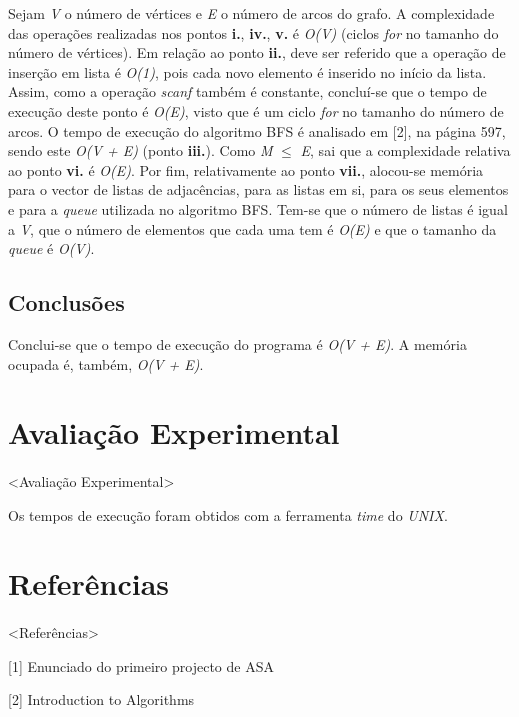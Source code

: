\documentclass[12pt, a4paper, margin=3cm]{article}
\begin{document}
Sejam \textit{V} o número de vértices e \textit{E} o número de arcos do grafo.
A complexidade das operações realizadas nos pontos \textbf{i.}, \textbf{iv.},
\textbf{v.} é \textit{O(V)} (ciclos \textit{for} no tamanho do número de vértices).
Em relação ao ponto \textbf{ii.}, deve ser referido que a operação de inserção
em lista é \textit{O(1)}, pois cada novo elemento é inserido no início da lista.
Assim, como a operação \textit{scanf} também é constante, concluí-se que o tempo
de execução deste ponto é \textit{O(E)}, visto que é um ciclo \textit{for} no
tamanho do número de arcos.
O tempo de execução do algoritmo BFS é analisado em [2], na página 597, sendo
este \textit{O(V + E)} (ponto \textbf{iii.}).
Como \textit{M} $\leq$ \textit{E}, sai que a complexidade relativa ao
ponto \textbf{vi.} é \textit{O(E)}.
Por fim, relativamente ao ponto \textbf{vii.}, alocou-se memória para o vector
de listas de adjacências, para as listas em si, para os seus elementos e para a
\textit{queue} utilizada no algoritmo BFS. Tem-se que o número de listas é igual
a \textit{V}, que o número de elementos que cada uma tem é \textit{O(E)} e que o
tamanho da \textit{queue} é \textit{O(V)}.

\subsection{Conclusões}
Conclui-se que o tempo de execução do programa é \textit{O(V + E)}.
A memória ocupada é, também, \textit{O(V + E)}.


\section{Avaliação Experimental}
\paragraph{}
<Avaliação Experimental>

Os tempos de execução foram obtidos com a ferramenta \textit{time} do
\textit{UNIX}.

\section{Referências}
\paragraph{}
<Referências>

[1] Enunciado do primeiro projecto de ASA

[2] Introduction to Algorithms
\end{document}
